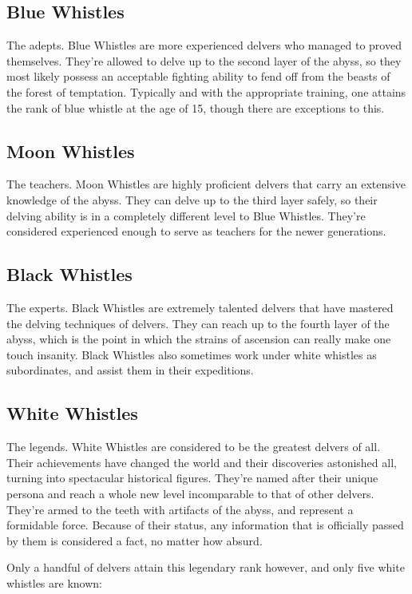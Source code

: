 \subsection{Blue Whistles}
The adepts. Blue Whistles are more experienced delvers who managed to proved themselves. They're allowed to delve up to the second layer of the abyss, so they most likely possess an acceptable fighting ability to fend off from the beasts of the forest of temptation. Typically and with the appropriate training, one attains the rank of blue whistle at the age of 15, though there are exceptions to this. 

\subsection{Moon Whistles}
The teachers. Moon Whistles are highly proficient delvers that carry an extensive knowledge of the abyss. They can delve up to the third layer safely, so their delving ability is in a completely different level to Blue Whistles. They're considered experienced enough to serve as teachers for the newer generations. 

\subsection{Black Whistles}
The experts. Black Whistles are extremely talented delvers that have mastered the delving techniques of delvers. They can reach up to the fourth layer of the abyss, which is the point in which the strains of ascension can really make one touch insanity. Black Whistles also sometimes work under white whistles as subordinates, and assist them in their expeditions. 

\subsection{White Whistles}
The legends. White Whistles are considered to be the greatest delvers of all. Their achievements have changed the world and their discoveries astonished all, turning into spectacular historical figures. They're named after their unique persona and reach a whole new level incomparable to that of other delvers. They're armed to the teeth with artifacts of the abyss, and represent a formidable force. Because of their status, any information that is officially passed by them is considered a fact, no matter how absurd. 

Only a handful of delvers attain this legendary rank however, and only five white whistles are known:

